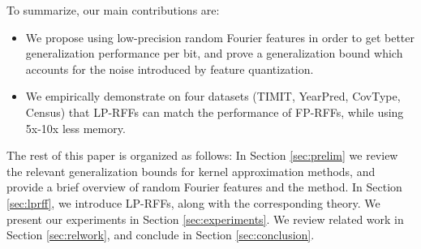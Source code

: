 
To summarize, our main contributions are:
\begin{itemize}
	\item We propose using low-precision random Fourier features in order to get better generalization performance per bit, and prove a generalization bound which accounts for the noise introduced by feature quantization.
	\item We empirically demonstrate on four datasets (TIMIT, YearPred, CovType, Census) that LP-RFFs can match the performance of FP-RFFs, while using 5x-10x less memory.
\end{itemize}

The rest of this paper is organized as follows: In Section \ref{sec:prelim} we review the relevant generalization bounds for kernel approximation methods, and provide a brief overview of random Fourier features and the \Nystrom method.  In Section \ref{sec:lprff}, we introduce LP-RFFs, along with the corresponding theory. We present our experiments in Section \ref{sec:experiments}.  We review related work in Section \ref{sec:relwork}, and conclude in Section \ref{sec:conclusion}.








